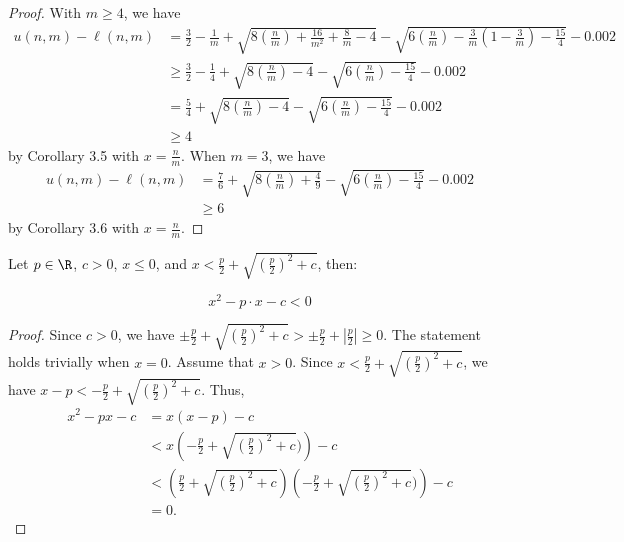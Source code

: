 \begin{proof}
    \leanok
    With $m \geq 4$, we have
\begin{align*}
u(n,m)-\ell(n,m)
& =
 \frac{3}{2}-\frac{1}{m}+
\sqrt{8\left(\frac{n}{m}\right)+\frac{16}{m^2}+\frac{8}{m}-4} - 
\sqrt{6\left(\frac{n}{m}\right)-\frac{3}{m}\left(1-\frac{3}{m}\right)-\frac{15}{4}} - 0.002 \\
& \geq
 \frac{3}{2}-\frac{1}{4}+
\sqrt{8\left(\frac{n}{m}\right)-4} - 
\sqrt{6\left(\frac{n}{m}\right)-\frac{15}{4}} - 0.002 \\
& =
 \frac{5}{4}+
\sqrt{8\left(\frac{n}{m}\right)-4} - 
\sqrt{6\left(\frac{n}{m}\right)-\frac{15}{4}} - 0.002 \\
& \geq 4
\end{align*}
  by Corollary 3.5 with $x = \frac{n}{m}$.
When $m = 3$, we have
\begin{align*}
u(n,m) - \ell(n,m)
& = \frac{7}{6} + 
\sqrt{8\left(\frac{n}{m}\right) + \frac{4}{9}}
-\sqrt{6\left(\frac{n}{m}\right) - \frac{15}{4}} - 0.002 \\
& \geq 6
\end{align*}
  by Corollary 3.6 with $x = \frac{n}{m}$.
\end{proof}

\begin{lemma}[qub]
    \label{lem:qub}
    \leanok
    Let $p\in \R$, $c > 0$, $x\leq 0$, and $x< \frac{p}{2} + \sqrt{\left(\frac{p}{2}\right)^2 + c}$, then:

    \[
        x^2 - p \cdot x- c < 0
    \]
\end{lemma}

\begin{proof}
    \leanok
    Since $c > 0$, we have
    $\pm\frac{p}{2} + \sqrt{\left(\frac{p}{2}\right)^ 2 + c}
       > \pm\frac{p}{2} + \left\lvert\frac{p}{2}\right\rvert \geq 0.$
        The statement holds trivially when $x = 0$.
        Assume that $x > 0$.
        Since $x < \frac{p}{2} + \sqrt{\left(\frac{p}{2}\right)^ 2 + c}$, we have
        $x - p < -\frac{p}{2} + \sqrt{\left(\frac{p}{2}\right)^ 2 + c}$.
        Thus,
        \begin{align*}
        x^2 - px - c
        & = x(x - p) - c \\
        & < x\left(-\frac{p}{2}+\sqrt{\left(\frac{p}{2}\right)^ 2 + c})\right)-c \\
        & < \left(\frac{p}{2} + \sqrt{\left(\frac{p}{2}\right)^ 2 + c}\right)
        \left(-\frac{p}{2}+\sqrt{\left(\frac{p}{2}\right)^ 2 + c})\right) - c \\
        & = 0.
        \end{align*}
\end{proof}

